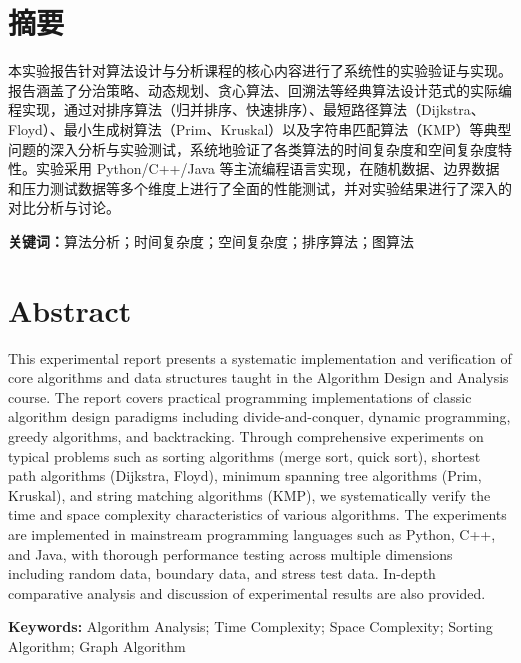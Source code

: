 \documentclass[12pt,a4paper,UTF8]{article}
\begin{document}
\section*{摘要}

本实验报告针对算法设计与分析课程的核心内容进行了系统性的实验验证与实现。报告涵盖了分治策略、动态规划、贪心算法、回溯法等经典算法设计范式的实际编程实现，通过对排序算法（归并排序、快速排序）、最短路径算法（Dijkstra、Floyd）、最小生成树算法（Prim、Kruskal）以及字符串匹配算法（KMP）等典型问题的深入分析与实验测试，系统地验证了各类算法的时间复杂度和空间复杂度特性。实验采用 Python/C++/Java 等主流编程语言实现，在随机数据、边界数据和压力测试数据等多个维度上进行了全面的性能测试，并对实验结果进行了深入的对比分析与讨论。

\vspace{1em}
\noindent\textbf{关键词：}算法分析；时间复杂度；空间复杂度；排序算法；图算法

\newpage
\section*{Abstract}

This experimental report presents a systematic implementation and verification of core algorithms and data structures taught in the Algorithm Design and Analysis course. The report covers practical programming implementations of classic algorithm design paradigms including divide-and-conquer, dynamic programming, greedy algorithms, and backtracking. Through comprehensive experiments on typical problems such as sorting algorithms (merge sort, quick sort), shortest path algorithms (Dijkstra, Floyd), minimum spanning tree algorithms (Prim, Kruskal), and string matching algorithms (KMP), we systematically verify the time and space complexity characteristics of various algorithms. The experiments are implemented in mainstream programming languages such as Python, C++, and Java, with thorough performance testing across multiple dimensions including random data, boundary data, and stress test data. In-depth comparative analysis and discussion of experimental results are also provided.

\vspace{1em}
\noindent\textbf{Keywords:} Algorithm Analysis; Time Complexity; Space Complexity; Sorting Algorithm; Graph Algorithm
\end{document}
